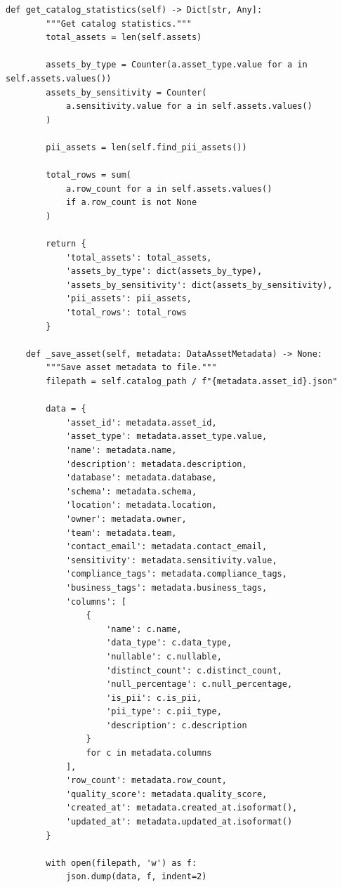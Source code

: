 \begin{lstlisting}[style=python, caption={Enterprise data catalog with automated metadata extraction}]
    def get_catalog_statistics(self) -> Dict[str, Any]:
        """Get catalog statistics."""
        total_assets = len(self.assets)

        assets_by_type = Counter(a.asset_type.value for a in self.assets.values())
        assets_by_sensitivity = Counter(
            a.sensitivity.value for a in self.assets.values()
        )

        pii_assets = len(self.find_pii_assets())

        total_rows = sum(
            a.row_count for a in self.assets.values()
            if a.row_count is not None
        )

        return {
            'total_assets': total_assets,
            'assets_by_type': dict(assets_by_type),
            'assets_by_sensitivity': dict(assets_by_sensitivity),
            'pii_assets': pii_assets,
            'total_rows': total_rows
        }

    def _save_asset(self, metadata: DataAssetMetadata) -> None:
        """Save asset metadata to file."""
        filepath = self.catalog_path / f"{metadata.asset_id}.json"

        data = {
            'asset_id': metadata.asset_id,
            'asset_type': metadata.asset_type.value,
            'name': metadata.name,
            'description': metadata.description,
            'database': metadata.database,
            'schema': metadata.schema,
            'location': metadata.location,
            'owner': metadata.owner,
            'team': metadata.team,
            'contact_email': metadata.contact_email,
            'sensitivity': metadata.sensitivity.value,
            'compliance_tags': metadata.compliance_tags,
            'business_tags': metadata.business_tags,
            'columns': [
                {
                    'name': c.name,
                    'data_type': c.data_type,
                    'nullable': c.nullable,
                    'distinct_count': c.distinct_count,
                    'null_percentage': c.null_percentage,
                    'is_pii': c.is_pii,
                    'pii_type': c.pii_type,
                    'description': c.description
                }
                for c in metadata.columns
            ],
            'row_count': metadata.row_count,
            'quality_score': metadata.quality_score,
            'created_at': metadata.created_at.isoformat(),
            'updated_at': metadata.updated_at.isoformat()
        }

        with open(filepath, 'w') as f:
            json.dump(data, f, indent=2)


\end{lstlisting}
